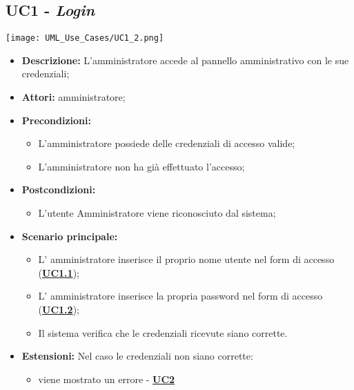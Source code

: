 \setcounter{secnumdepth}{0}

\subsection{UC1 - \textit{Login}}
\label{sec:UC1}
\texttt{[image: UML\_Use\_Cases/UC1\_2.png]}
\begin{itemize}
	\item \textbf{Descrizione:} L’amministratore accede al pannello amministrativo con le sue credenziali;
	\item \textbf{Attori:} amministratore;
	\item \textbf{Precondizioni:} 
	\begin{itemize}
		\item L’amministratore possiede delle credenziali di accesso valide;
		\item L’amministratore non ha già effettuato l’accesso;
	\end{itemize}
	\item \textbf{Postcondizioni:} 
	\begin{itemize}
		\item L’utente Amministratore viene riconosciuto dal sistema;
	\end{itemize}
	\item \textbf{Scenario principale:} 
	\begin{itemize}
		\item L’ amministratore inserisce il proprio nome utente nel form di accesso (\hyperref[sec:UC1.1]{\textbf{UC1.1}});
		\item L’ amministratore inserisce la propria password nel form di accesso (\hyperref[sec:UC1.2]{\textbf{UC1.2}});
		\item Il sistema verifica che le credenziali ricevute siano corrette. 
	\end{itemize}
	\item \textbf{Estensioni:} Nel caso le credenziali non siano corrette:
	\begin{itemize}
		\item viene mostrato un errore - \hyperref[sec:UC2]{\textbf{UC2}}
	\end{itemize}
\end{itemize}

